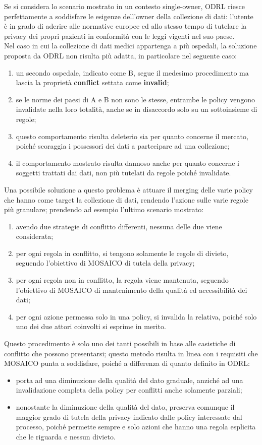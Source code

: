 \documentclass[12pt,a4paper,twoside]{book}
\begin{document}
Se si considera lo scenario mostrato in un contesto single-owner, ODRL riesce perfettamente a soddisfare le esigenze dell'owner della collezione di dati: l'utente è in grado di aderire alle normative europee ed allo stesso tempo di tutelare la privacy dei propri pazienti in conformità con le leggi vigenti nel suo paese.\\
Nel caso in cui la collezione di dati medici appartenga a più ospedali, la soluzione proposta da ODRL non risulta più adatta, in particolare nel seguente caso:
\begin{enumerate}
	\item un secondo ospedale, indicato come B, segue il medesimo procedimento ma lascia la proprietà \textbf{conflict} settata come \textbf{invalid};
	\item se le norme dei paesi di A e B non sono le stesse, entrambe le policy vengono invalidate nella loro totalità, anche se in disaccordo solo su un sottoinsieme di regole;
	\item questo comportamento risulta deleterio sia per quanto concerne il mercato, poiché scoraggia i possessori dei dati a partecipare ad una collezione; \item il comportamento mostrato risulta dannoso anche per quanto concerne i soggetti trattati dai dati, non più tutelati da regole poiché invalidate.
\end{enumerate}
Una possibile soluzione a questo problema è attuare il merging delle varie policy che hanno come target la collezione di dati, rendendo l'azione sulle varie regole più granulare; prendendo ad esempio l'ultimo scenario mostrato:
\begin{enumerate}
	\item avendo due strategie di conflitto differenti, nessuna delle due viene considerata;
	\item per ogni regola in conflitto, si tengono solamente le regole di divieto, seguendo l'obiettivo di MOSAICO di tutela della privacy;
	\item per ogni regola non in conflitto, la regola viene mantenuta, seguendo l'obiettivo di MOSAICO di mantenimento della qualità ed accessibilità dei dati;
	\item per ogni azione permessa solo in una policy, si invalida la relativa, poiché solo uno dei due attori coinvolti si esprime in merito.
\end{enumerate}
Questo procedimento è solo uno dei tanti possibili in base alle casistiche di conflitto che possono presentarsi; questo metodo risulta in linea con i requisiti che MOSAICO punta a soddisfare, poiché a differenza di quanto definito in ODRL:
\begin{itemize}
	\item porta ad una diminuzione della qualità del dato graduale, anziché ad una invalidazione completa della policy per conflitti anche solamente parziali;
	\item nonostante la diminuzione della qualità del dato, preserva comunque il maggior grado di tutela della privacy indicato dalle policy interessate dal processo, poiché permette sempre e solo azioni che hanno una regola esplicita che le riguarda e nessun divieto.
\end{itemize}
\end{document}
